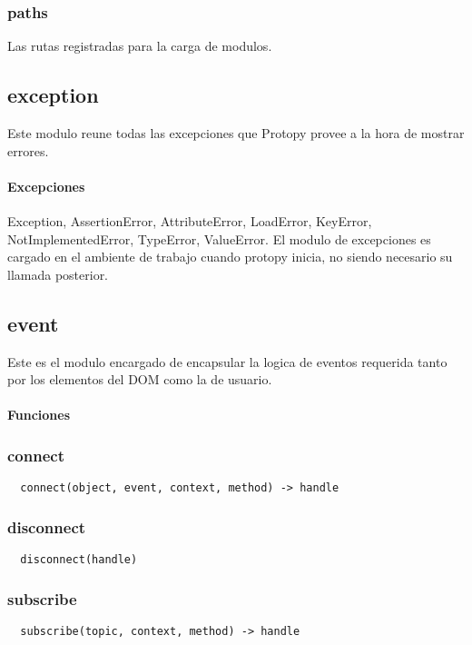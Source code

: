 \subsubsection*{paths}
Las rutas registradas para la carga de modulos.

\subsection{exception}
Este modulo reune todas las excepciones que Protopy provee a la hora de mostrar
errores.
\paragraph{Excepciones}
Exception, AssertionError, AttributeError, LoadError, KeyError,
NotImplementedError, TypeError, ValueError.
El modulo de excepciones es cargado en el ambiente de trabajo cuando protopy
inicia, no siendo necesario su llamada posterior.

\subsection{event}
Este es el modulo encargado de encapsular la logica de eventos requerida tanto por los elementos del DOM como la de usuario.

\paragraph{Funciones}
\subsubsection*{connect}
\begin{verbatim}
  connect(object, event, context, method) -> handle
\end{verbatim}

\subsubsection*{disconnect}
\begin{verbatim}
  disconnect(handle)
\end{verbatim}

\subsubsection*{subscribe}
\begin{verbatim}
  subscribe(topic, context, method) -> handle
\end{verbatim}

